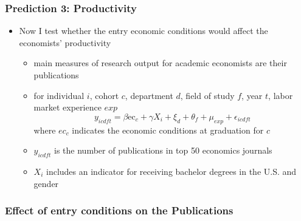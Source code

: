 \documentclass[11pt]{beamer}
\begin{document}
\begin{frame}
	\frametitle{Prediction 3: Productivity}
	\begin{itemize}
		\item Now I test whether the entry economic conditions would affect the economists' productivity
		\begin{itemize}
			\item main measures of research output for academic economists are their publications
			\item for individual $i$, cohort $c$,  department $d$, field of study $f$, year $t$, labor market experience $exp$
				\begin{equation*}
					y_{icdft} = \beta \text{ec}_{c}+\gamma X_{i}+\xi_{d}+\theta_f +\mu_{exp}  +\epsilon_{icdft}
				\end{equation*}
				where $ec_c$ indicates the economic conditions at graduation for $c$
				\item $y_{icdft}$ is the number of publications in top 50 economics journals
				\item $X_i$ includes an indicator for receiving bachelor degrees in the U.S. and gender 
			\end{itemize}
	\end{itemize}
\end{frame}

{
	\begin{frame}
		\frametitle{Effect of entry conditions on the Publications}
		
	\end{frame}
}
\end{document}
